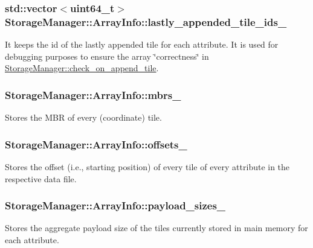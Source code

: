 \subsubsection[{lastly\+\_\+appended\+\_\+tile\+\_\+ids\+\_\+}]{\setlength{\rightskip}{0pt plus 5cm}std\+::vector$<$uint64\+\_\+t$>$ Storage\+Manager\+::\+Array\+Info\+::lastly\+\_\+appended\+\_\+tile\+\_\+ids\+\_\+}\label{structStorageManager_1_1ArrayInfo_ad8a93fcfecfefc7a9d784f2474cc8683}
It keeps the id of the lastly appended tile for each attribute. It is used for debugging purposes to ensure the array \char`\"{}correctness\char`\"{} in \hyperlink{classStorageManager_a7c45bdaf838c3be5472c51712af5b223}{Storage\+Manager\+::check\+\_\+on\+\_\+append\+\_\+tile}. \hypertarget{structStorageManager_1_1ArrayInfo_a86031a1485d05c1eb6b83dfcfe376fbe}{}
\subsubsection[{mbrs\+\_\+}]{ Storage\+Manager\+::\+Array\+Info\+::mbrs\+\_\+}\label{structStorageManager_1_1ArrayInfo_a86031a1485d05c1eb6b83dfcfe376fbe}
Stores the M\+B\+R of every (coordinate) tile. \hypertarget{structStorageManager_1_1ArrayInfo_a827acecebaa566e97f0954fc59cb9fe0}{}
\subsubsection[{offsets\+\_\+}]{ Storage\+Manager\+::\+Array\+Info\+::offsets\+\_\+}\label{structStorageManager_1_1ArrayInfo_a827acecebaa566e97f0954fc59cb9fe0}
Stores the offset (i.\+e., starting position) of every tile of every attribute in the respective data file. \hypertarget{structStorageManager_1_1ArrayInfo_a499762205edde51a24aa6229ba17aa44}{}
\subsubsection[{payload\+\_\+sizes\+\_\+}]{ Storage\+Manager\+::\+Array\+Info\+::payload\+\_\+sizes\+\_\+}\label{structStorageManager_1_1ArrayInfo_a499762205edde51a24aa6229ba17aa44}
Stores the aggregate payload size of the tiles currently stored in main memory for each attribute. \hypertarget{structStorageManager_1_1ArrayInfo_af758a081c7584aed42a93693f92f3115}{}
